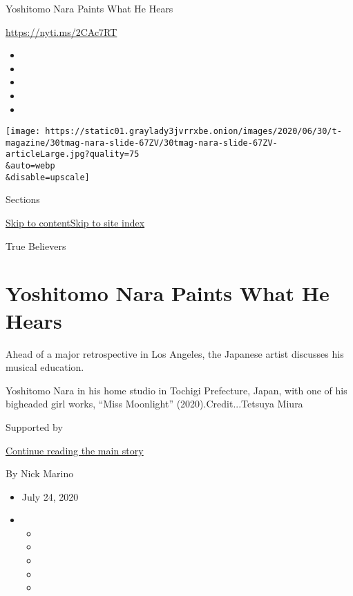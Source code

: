 Yoshitomo Nara Paints What He Hears

\url{https://nyti.ms/2CAc7RT}

\begin{itemize}
\item
\item
\item
\item
\item
\end{itemize}

\texttt{[image: https://static01.graylady3jvrrxbe.onion/images/2020/06/30/t-magazine/30tmag-nara-slide-67ZV/30tmag-nara-slide-67ZV-articleLarge.jpg?quality=75\\\&auto=webp\\\&disable=upscale]}

Sections

\protect\hyperlink{site-content}{Skip to
content}\protect\hyperlink{site-index}{Skip to site index}

True Believers

\hypertarget{yoshitomo-nara-paints-what-he-hears}{%
\section{Yoshitomo Nara Paints What He
Hears}\label{yoshitomo-nara-paints-what-he-hears}}

Ahead of a major retrospective in Los Angeles, the Japanese artist
discusses his musical education.

Yoshitomo Nara in his home studio in Tochigi Prefecture, Japan, with one
of his bigheaded girl works, ``Miss Moonlight'' (2020).Credit...Tetsuya
Miura

Supported by

\protect\hyperlink{after-sponsor}{Continue reading the main story}

By Nick Marino

\begin{itemize}
\item
  July 24, 2020
\item
  \begin{itemize}
  \item
  \item
  \item
  \item
  \item
  \end{itemize}
\end{itemize}

